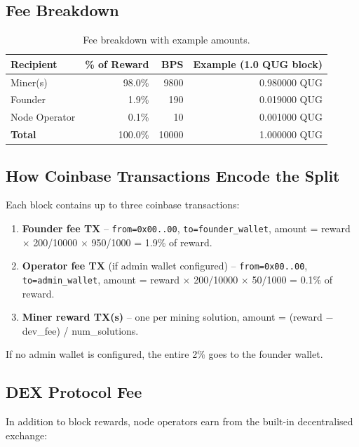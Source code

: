 \documentclass[11pt,a4paper]{article}
\begin{document}
\subsection{Fee Breakdown}

\begin{table}[H]
\centering
\begin{tabular}{@{}lrrr@{}}
\toprule
\textbf{Recipient} & \textbf{\% of Reward} & \textbf{BPS} & \textbf{Example (1.0 QUG block)} \\
\midrule
Miner(s)       & 98.0\%  & 9800  & 0.980000 QUG \\
Founder        & 1.9\%   & 190   & 0.019000 QUG \\
Node Operator  & 0.1\%   & 10    & 0.001000 QUG \\
\midrule
\textbf{Total} & 100.0\% & 10000 & 1.000000 QUG \\
\bottomrule
\end{tabular}
\caption{Fee breakdown with example amounts.}
\end{table}

\subsection{How Coinbase Transactions Encode the Split}

Each block contains up to three coinbase transactions:

\begin{enumerate}[nosep]
    \item \textbf{Founder fee TX} -- \texttt{from=0x00..00}, \texttt{to=founder\_wallet},
          amount = reward $\times$ 200/10000 $\times$ 950/1000 = 1.9\% of reward.
    \item \textbf{Operator fee TX} (if admin wallet configured) --
          \texttt{from=0x00..00}, \texttt{to=admin\_wallet},
          amount = reward $\times$ 200/10000 $\times$ 50/1000 = 0.1\% of reward.
    \item \textbf{Miner reward TX(s)} -- one per mining solution,
          amount = (reward $-$ dev\_fee) / num\_solutions.
\end{enumerate}

If no admin wallet is configured, the entire 2\% goes to the founder wallet.

\subsection{DEX Protocol Fee}

In addition to block rewards, node operators earn from the built-in
decentralised exchange:
\end{document}
